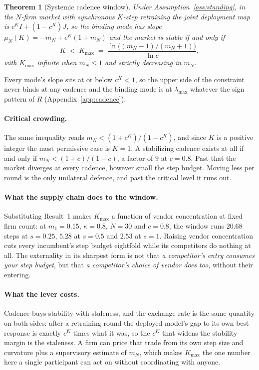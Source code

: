 \documentclass{article}
\theoremstyle{plain}
\newtheorem{theorem}{Theorem}
\theoremstyle{definition}
\newcommand{\mN}{m_N}
\newcommand{\lmax}{\lambda_{\max}}
\begin{document}
\begin{theorem}[Systemic cadence window]
\label{thm:cadence}
Under Assumption~\ref{ass:standing}, in the $N$-firm market with synchronous $K$-step retraining the joint deployment map is $c^K I + (1-c^K)J$, so the binding mode has slope $\mu_N(K) = -\mN + c^K(1+\mN)$ and the market is stable if and only if
\begin{equation}
K \;<\; K_{\max} \;=\; \frac{\ln\bigl((\mN-1)/(\mN+1)\bigr)}{\ln c},
\end{equation}
with $K_{\max}$ infinite when $\mN \le 1$ and strictly decreasing in $\mN$.
\end{theorem}

Every mode's slope sits at or below $c^K<1$, so the upper side of the constraint never binds at any cadence and the binding mode is at $\lmax$ whatever the sign pattern of $R$ (Appendix~\ref{app:cadence}).

\paragraph{Critical crowding.}
The same inequality reads $\mN < (1+c^K)/(1-c^K)$, and since $K$ is a positive integer the most permissive case is $K=1$. A stabilizing cadence exists at all if and only if $\mN < (1+c)/(1-c)$, a factor of $9$ at $c=0.8$. Past that the market diverges at every cadence, however small the step budget. Moving less per round is the only unilateral defence, and past the critical level it runs out.

\paragraph{What the supply chain does to the window.}
Substituting Result~1 makes $K_{\max}$ a function of vendor concentration at fixed firm count: at $m_1 = 0.15$, $\kappa = 0.8$, $N=30$ and $c=0.8$, the window runs $20.68$ steps at $s = 0.25$, $5.28$ at $s = 0.5$ and $2.53$ at $s = 1$. Raising vendor concentration cuts every incumbent's step budget eightfold while its competitors do nothing at all. The externality in its sharpest form is not that \emph{a competitor's entry consumes your step budget}, but that \emph{a competitor's choice of vendor does too}, without their entering.

\paragraph{What the lever costs.}
Cadence buys stability with staleness, and the exchange rate is the same quantity on both sides: after a retraining round the deployed model's gap to its own best response is exactly $c^K$ times what it was, so the $c^K$ that widens the stability margin is the staleness. A firm can price that trade from its own step size and curvature plus a supervisory estimate of $\mN$, which makes $K_{\max}$ the one number here a single participant can act on without coordinating with anyone.
\end{document}
